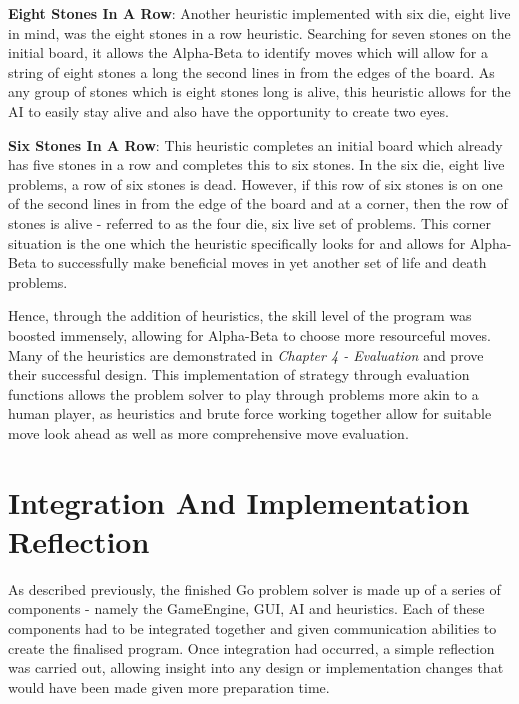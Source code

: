 \documentclass{l3proj}
\begin{document}
\textbf{Eight Stones In A Row}: Another heuristic implemented with six die, eight live in mind, was the eight stones in a row heuristic. Searching for seven stones on the initial board, it allows the Alpha-Beta to identify moves which will allow for a string of eight stones a long the second lines in from the edges of the board. As any group of stones which is eight stones long is alive, this heuristic allows for the AI to easily stay alive and also have the opportunity to create two eyes.

\textbf{Six Stones In A Row}: This heuristic completes an initial board which already has five stones in a row and completes this to six stones. In the six die, eight live problems, a row of six stones is dead. However, if this row of six stones is on one of the second lines in from the edge of the board and at a corner, then the row of stones is alive - referred to as the four die, six live set of problems. This corner situation is the one which the heuristic specifically looks for and allows for Alpha-Beta to successfully make beneficial moves in yet another set of life and death problems.

Hence, through the addition of heuristics, the skill level of the program was boosted immensely, allowing for Alpha-Beta to choose more resourceful moves. Many of the heuristics are demonstrated in \textit{Chapter 4 - Evaluation} and prove their successful design. This implementation of strategy through evaluation functions allows the problem solver to play through problems more akin to a human player, as heuristics and brute force working together allow for suitable move look ahead as well as more comprehensive move evaluation.

\section{Integration And Implementation Reflection}

As described previously, the finished Go problem solver is made up of a series of components - namely the GameEngine, GUI, AI and heuristics. Each of these components had to be integrated together and given communication abilities to create the finalised program. Once integration had occurred, a simple reflection was carried out, allowing insight into any design or implementation changes that would have been made given more preparation time.
\end{document}
